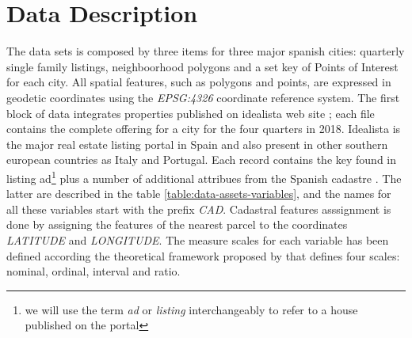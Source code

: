\documentclass[times,final]{elsarticle}
\begin{document}
\section*{Data Description}

\noindent

The data sets is composed by three items for three major spanish cities: quarterly single family listings, neighboorhood polygons and a set key of Points of Interest for each city. All spatial features, such as polygons and points, are expressed in geodetic coordinates using the \emph{EPSG:4326} coordinate reference system. The first block of data integrates properties published on idealista web site \cite{idealista}; each file contains the complete offering for a city for the four quarters in 2018. Idealista is the major real estate listing portal in Spain and also present in other southern european countries as Italy and Portugal. Each record contains the key found in listing ad\footnote{we will use the term \emph{ad} or \emph{listing} interchangeably to refer to a house published on the portal} plus a number of additional attribues from the Spanish cadastre \cite{Catastro}. The latter are described in the table \ref{table:data-assets-variables}, and the names for all these variables start with the prefix \emph{CAD}. Cadastral features asssignment is done by assigning the features of the nearest parcel to the coordinates \emph{LATITUDE} and \emph{LONGITUDE}. The measure scales for each variable has been defined according the theoretical framework proposed by \cite{stevens1946theory} that defines four scales: nominal, ordinal, interval and ratio.
\end{document}
